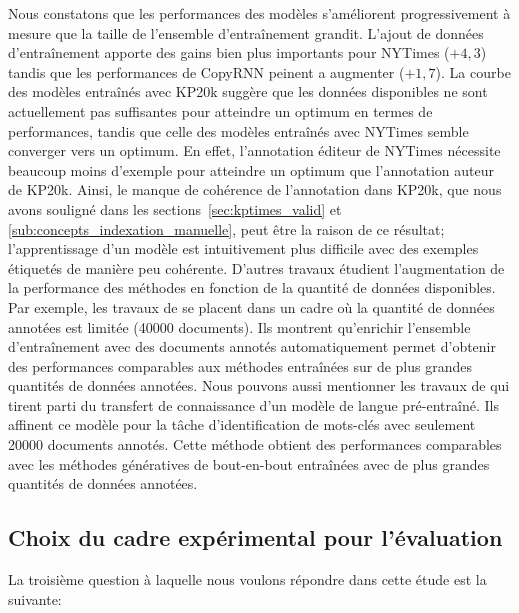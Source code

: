 Nous constatons que les performances des modèles s'améliorent progressivement à mesure que la taille de l'ensemble d'entraînement grandit.
%
L'ajout de données d'entraînement apporte des gains bien plus importants pour NYTimes ($+4,3$) tandis que les performances de CopyRNN peinent a augmenter ($+1,7$).
La courbe des modèles entraînés avec KP20k suggère que les données disponibles ne sont actuellement pas suffisantes pour atteindre un optimum en termes de performances, tandis que celle des modèles entraînés avec NYTimes semble converger vers un optimum.
%
En effet, l'annotation éditeur de NYTimes nécessite beaucoup moins d'exemple pour atteindre un optimum que l'annotation auteur de KP20k.
Ainsi, le manque de cohérence de l'annotation dans KP20k, que nous avons souligné dans les sections~\ref{sec:kptimes_valid} et \ref{sub:concepts_indexation_manuelle}, peut être la raison de ce résultat; l'apprentissage d'un modèle est intuitivement plus difficile avec des exemples étiquetés de manière peu cohérente. 
D'autres travaux étudient l'augmentation de la performance des méthodes en fonction de la quantité de données disponibles.
Par exemple, les travaux de \citet{ye_semi-supervised_2018} se placent dans un cadre où la quantité de données annotées est limitée (\num{40 000} documents). Ils montrent qu'enrichir l'ensemble d'entraînement avec des documents annotés automatiquement permet d'obtenir des performances comparables aux méthodes entraînées sur de plus grandes quantités de données annotées.
Nous pouvons aussi mentionner les travaux de \citet{martinc_tnt-kid_2021} qui tirent parti du transfert de connaissance d'un modèle de langue pré-entraîné.
Ils affinent ce modèle pour la tâche d'identification de mots-clés avec seulement \num{20 000} documents annotés. Cette méthode obtient des performances comparables avec les méthodes génératives de bout-en-bout entraînées avec de plus grandes quantités de données annotées.


\subsection{Choix du cadre expérimental pour l'évaluation}

La troisième question à laquelle nous voulons répondre dans cette étude est la suivante: 

